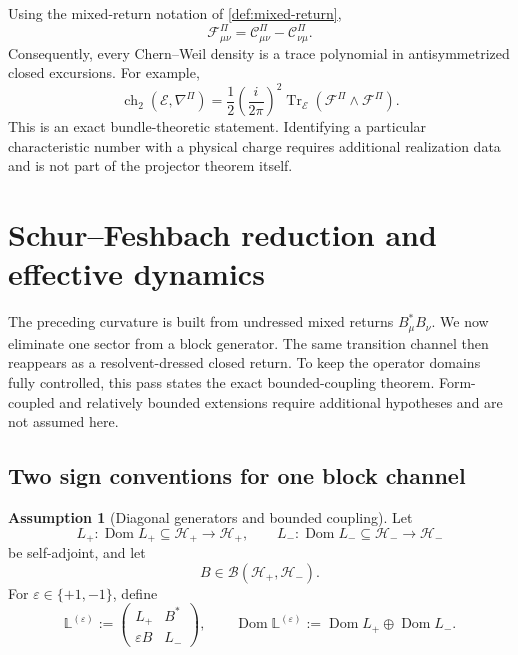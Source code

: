 \documentclass[11pt,reqno]{scrartcl}
\newcommand{\scrHp}{\mathscr H_{+}}
\newcommand{\scrHm}{\mathscr H_{-}}
\DeclareMathOperator{\Dom}{Dom}
\DeclareMathOperator{\Tr}{Tr}
\newcommand{\gaugeF}{\mathcal F}
\theoremstyle{plain}
\theoremstyle{definition}
\newtheorem{assumption}[assumption]{Assumption}
\theoremstyle{remark}
\begin{document}
Using the mixed-return notation of \cref{def:mixed-return},
\begin{equation}
  \gaugeF_{\mu\nu}^{\Pi}
  =\mathscr C_{\mu\nu}^{\Pi}
   -\mathscr C_{\nu\mu}^{\Pi}.
\end{equation}
Consequently, every Chern--Weil density is a trace polynomial in
antisymmetrized closed excursions.  For example,
\begin{equation}
  \operatorname{ch}_2(\mathscr E,\nabla^\Pi)
  =\frac{1}{2}
   \left(\frac{i}{2\pi}\right)^2
   \Tr_{\mathscr E}(\gaugeF^\Pi\wedge\gaugeF^\Pi).
  \label{eq:ch2-return}
\end{equation}
This is an exact bundle-theoretic statement.  Identifying a particular
characteristic number with a physical charge requires additional realization
data and is not part of the projector theorem itself.


\section{Schur--Feshbach reduction and effective dynamics}
\label{sec:effective-dynamics}

The preceding curvature is built from undressed mixed returns
\(B_\mu^*B_\nu\).  We now eliminate one sector from a block generator.  The
same transition channel then reappears as a resolvent-dressed closed return.
To keep the operator domains fully controlled, this pass states the exact
bounded-coupling theorem.  Form-coupled and relatively bounded extensions
require additional hypotheses and are not assumed here.

\subsection{Two sign conventions for one block channel}

\begin{assumption}[Diagonal generators and bounded coupling]
\label{ass:block-generator}
Let
\begin{equation}
  L_+:\Dom L_+\subseteq\scrHp\to\scrHp,
  \qquad
  L_-:\Dom L_-\subseteq\scrHm\to\scrHm
  \label{eq:diagonal-generators}
\end{equation}
be self-adjoint, and let
\begin{equation}
  B\in\mathcal B(\scrHp,\scrHm).
  \label{eq:bounded-coupling}
\end{equation}
For \(\varepsilon\in\{+1,-1\}\), define
\begin{equation}
  \mathbb L^{(\varepsilon)}
  :=
  \begin{pmatrix}
    L_+&B^*\\
    \varepsilon B&L_-
  \end{pmatrix},
  \qquad
  \Dom\mathbb L^{(\varepsilon)}
  :=\Dom L_+\oplus\Dom L_-.
  \label{eq:block-generator}
\end{equation}
\end{assumption}
\end{document}
